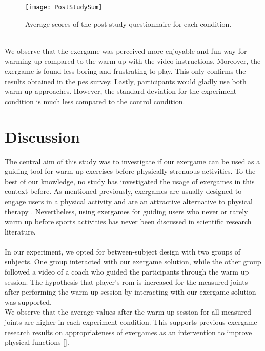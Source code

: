 \begin{figure}[h]
    \centering
    \texttt{[image: PostStudySum]}
    \caption{Average scores of the post study questionnaire for each condition.}
    \label{fig:poststudysum}
\end{figure}\\ We observe that the exergame was perceived more enjoyable and fun way for warming up compared to the warm up with the video instructions. Moreover, the exergame is found less boring and frustrating to play.  This only confirms the results obtained in the \acrshort{pes} survey. Lastly, participants would gladly use both warm up approaches. However, the standard deviation for the experiment condition is much less compared to the control condition.
\section{Discussion}
The central aim of this study was to investigate if our exergame can be used as a guiding tool for warm up exercises before physically strenuous activities. To the best of our knowledge, no study has investigated the usage of exergames in this context before. As mentioned previously, exergames are usually designed to engage users in a physical activity \cite{song2010effects, staiano2011exergames} and are an attractive alternative to physical therapy \cite{jansen2013serious}. Nevertheless, using exergames for guiding users who never or rarely warm up before sports activities has never been discussed in scientific research literature. \\\\
In our experiment, we opted for between-subject design with two groups of subjects. One group interacted with our exergame solution, while the other group followed a video of a coach who guided the participants through the warm up session. The hypothesis that player's \acrshort{rom} is increased for the measured joints after performing the warm up session by interacting with our exergame solution was supported. \\We observe that the average values after the warm up session for all measured joints are higher in each experiment condition. This supports previous exergame research results on appropriateness  of exergames  as an intervention to improve physical functions []. %
